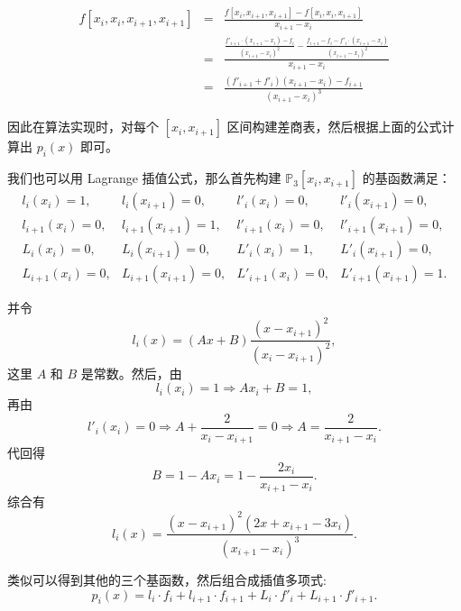 \documentclass[a4paper]{ctexart}
\begin{document}
{\begin{eqnarray*}
  f[x_i, x_i, x_{i + 1}, x_{i + 1}] &=& \frac{f[x_i, x_{i + 1}, x_{i + 1}] - f[x_i, x_i, x_{i + 1}]}{x_{i + 1} - x_{i}} \\
  &=& \frac{\frac{f'_{i + 1} \cdot (x_{i + 1} - x_i) - f_i}{(x_{i + 1} - x_i)^2} - \frac{f_{i + 1} - f_i - f'_i \cdot (x_{i + 1} - x_i)}{(x_{i + 1} - x_i)^2}}{x_{i + 1} - x_{i}} \\
  &=& \frac{(f'_{i + 1} + f'_i)(x_{i + 1} - x_i) - f_{i + 1}}{(x_{i + 1} - x_i)^3}
\end{eqnarray*}

因此在算法实现时，对每个 $[x_i, x_{i + 1}]$ 区间构建差商表，然后根据上面的公式计算出 $p_i(x)$ 即可。

我们也可以用  Lagrange 插值公式，那么首先构建 $\mathbb{P}_3[x_i, x_{i + 1}]$ 的基函数满足：
$$
  \begin{array}{llll}
  l_i(x_i) = 1, &l_i(x_{i + 1}) = 0, &l'_i(x_i) = 0, &l'_i(x_{i + 1}) = 0, \\
  l_{i + 1}(x_i) = 0, &l_{i + 1}(x_{i + 1}) = 1, &l'_{i + 1}(x_i) = 0, &l'_{i + 1}(x_{i + 1}) = 0, \\
  L_i(x_i) = 0, &L_i(x_{i + 1}) = 0, &L'_i(x_i) = 1, &L'_i(x_{i + 1}) = 0, \\
  L_{i + 1}(x_i) = 0, &L_{i + 1}(x_{i + 1}) = 0, &L'_{i + 1}(x_i) = 0, &L'_{i + 1}(x_{i + 1}) = 1.  
  \end{array}
$$

并令 
$$
l_i(x) = (A x + B)\frac{(x - x_{i + 1})^2}{(x_i - x_{i + 1})^2},
$$
这里 $A$ 和 $B$ 是常数。然后，由
$$
  l_i(x_i) = 1 \Rightarrow A x_i + B = 1,
$$
再由
$$
  l'_i(x_i) = 0 \Rightarrow A + \frac{2}{x_i - x_{i + 1}} = 0 \Rightarrow A = \frac{2}{x_{i + 1} - x_i}.
$$
代回得
$$
B = 1 - A x_i = 1 - \frac{2 x_i}{x_{i + 1} - x_i}.
$$
综合有
$$
l_i(x) = \frac{(x - x_{i + 1})^2(2x + x_{i + 1} - 3x_i)}{(x_{i + 1} - x_i)^3}.
$$

类似可以得到其他的三个基函数，然后组合成插值多项式:
$$
p_i(x) = l_i\cdot f_i + l_{i + 1} \cdot f_{i + 1} + L_i \cdot f'_i + L_{i + 1} \cdot f'_{i + 1}.
$$

}
\end{document}
